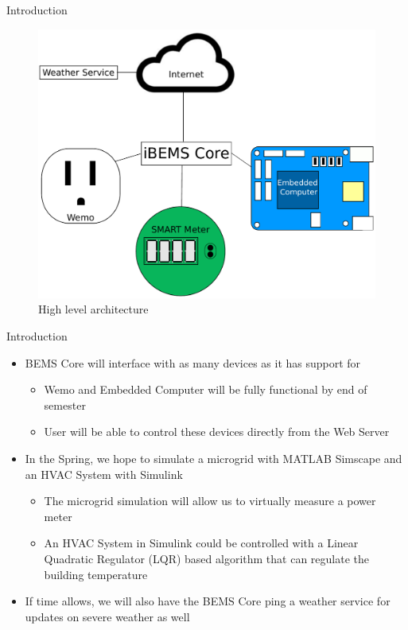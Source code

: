 \documentclass{beamer}
\begin{document}
\begin{frame}{Introduction}{}
    \begin{figure}
        \centering
        \includegraphics[scale=0.4]{figs/highLevelArchitecture.pdf}
        \caption{High level architecture}
        \label{fig:my_label}
    \end{figure}
\end{frame}

\begin{frame}{Introduction}{}
    \begin{itemize}
        \item BEMS Core will interface with as many devices as it has support for 
        \begin{itemize}
            \item Wemo and Embedded Computer will be fully functional by end of semester
            \item User will be able to control these devices directly from the Web Server
        \end{itemize}
        \item In the Spring, we hope to simulate a microgrid with MATLAB Simscape and an HVAC System with Simulink
        \begin{itemize}
            \item The microgrid simulation will allow us to virtually measure a power meter
            \item An HVAC System in Simulink could be controlled with a Linear Quadratic Regulator (LQR) based algorithm that can regulate the building temperature
        \end{itemize}
        \item If time allows, we will also have the BEMS Core ping a weather service for updates on severe weather as well
    \end{itemize}
\end{frame}
\end{document}

